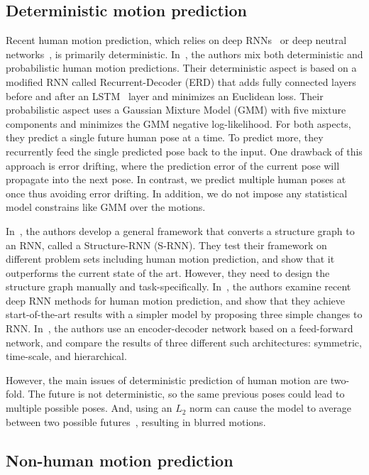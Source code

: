 \documentclass[10pt,twocolumn,letterpaper]{article}
\begin{document}
\subsection {Deterministic motion prediction}

Recent human motion prediction, which relies on deep RNNs~\cite{iccv2015:Katerina, cvpr2016:Ashesh, cvpr2017:julieta} or deep neutral networks~\cite{corr2017:Judith}, is primarily deterministic. In~\cite{iccv2015:Katerina}, the authors mix both deterministic and probabilistic human motion predictions. Their deterministic aspect is based on a modified RNN called Recurrent-Decoder (ERD) that adds fully connected layers before and after an LSTM~\cite{nc1997:Hochreiter} layer and minimizes an Euclidean loss. Their probabilistic aspect uses a Gaussian Mixture Model (GMM) with five mixture components and minimizes the GMM negative log-likelihood. For both aspects, they predict a single future human pose at a time. To predict more, they recurrently feed the single predicted pose back to the input. One drawback of this approach is error drifting, where the prediction error of the current pose will propagate into the next pose. In contrast, we predict multiple human poses at once thus avoiding error drifting. In addition, we do not impose any statistical model constrains like GMM over the motions.

In~\cite{cvpr2016:Ashesh}, the authors develop a general framework that converts a structure graph to an RNN, called a Structure-RNN (S-RNN). They test their framework on different problem sets including human motion prediction, and show that it outperforms the current state of the art. However, they need to design the structure graph manually and task-specifically. In~\cite{cvpr2017:julieta}, the authors examine recent deep RNN methods for human motion prediction, and show that they achieve start-of-the-art results with a simpler model by proposing three simple changes to RNN. In~\cite{corr2017:Judith}, the authors use an encoder-decoder network based on a feed-forward network, and compare the results of three different such architectures: symmetric, time-scale, and hierarchical.

However, the main issues of deterministic prediction of human motion are two-fold. The future is not deterministic, so the same previous poses could lead to multiple possible poses. And, using an $L_{2}$ norm can cause the model to average between two possible futures~\cite{corr2015:Mathieu}, resulting in blurred motions.

\subsection {Non-human motion prediction}
\end{document}
